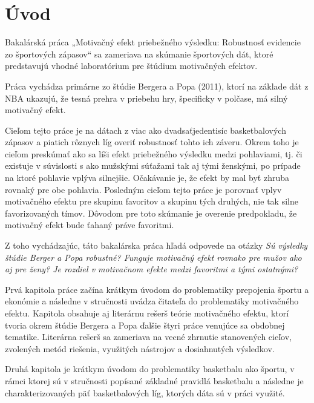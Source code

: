 \documentclass[
  digital, %
  oneside, %
  notable,   %
  lof,     %
  lot,     %
]{fithesis3}
\begin{document}
	\renewcommand{\listfigurename}{Zoznam grafov}
	\makeatletter
	\thesis@preamble %
	\makeatother
	
	\chapter*{Úvod}
	
	Bakalárská práca „Motivačný efekt priebežného výsledku: Robustnosť evidencie zo športových zápasov“ sa zameriava na skúmanie športových dát, ktoré predstavujú vhodné laboratórium pre štúdium motivačných efektov.
	
	Práca vychádza primárne zo štúdie Bergera a Popa (2011), ktorí na základe dát z NBA ukazujú, že tesná prehra v priebehu hry, špecificky v polčase, má silný motivačný efekt. 
	
	Cieľom tejto práce je na dátach z viac ako dvadsaťjedentisíc  basketbalových zápasov a piatich rôznych líg overiť robustnosť tohto ich záveru. Okrem toho je cieľom preskúmať ako sa líši efekt priebežného výsledku medzi pohlaviami, tj. či existuje v súvislosti s ako mužskými súťažami tak aj tými ženskými, po prípade na ktoré pohlavie vplýva silnejšie. Očakávanie je, že efekt by mal byť zhruba rovnaký pre obe pohlavia. Posledným cieľom tejto práce je porovnať vplyv motivačného efektu pre skupinu favoritov a skupinu tých druhých, nie tak silne favorizovaných tímov. Dôvodom pre toto skúmanie je overenie predpokladu, že motivačný efekt bude ťahaný práve favoritmi.
	
	Z toho vychádzajúc, táto bakalárska práca hľadá odpovede na otázky \textit{Sú výsledky štúdie Berger a Popa robustné? Funguje motivačný efekt rovnako pre mužov ako aj pre ženy? Je rozdiel v motivačnom efekte medzi favoritmi a tými ostatnými?} 
	
	Prvá kapitola práce začína krátkym úvodom do problematiky prepojenia športu a ekonómie a následne v stručnosti uvádza čitateľa do problematiky  motivačného efektu. Kapitola obsahuje aj literárnu rešerš teórie motivačného efektu, ktorí tvoria okrem štúdie Bergera a Popa ďalšie štyri práce venujúce sa obdobnej tematike. Literárna rešerš sa zameriava na vecné zhrnutie stanovených cieľov, zvolených metód riešenia, využitých nástrojov a dosiahnutých výsledkov. 
	
	Druhá kapitola je krátkym úvodom do problematiky basketbalu ako športu, v rámci ktorej sú v stručnosti popísané základné pravidlá basketbalu a následne je charakterizovaných päť basketbalových líg, ktorých dáta sú v práci využité.
	
\end{document}
